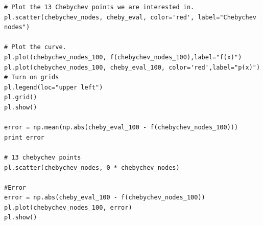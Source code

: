 \documentclass[a4paper,11pt]{article}
\begin{document}
{\begin{lstlisting}
# Plot the 13 Chebychev points we are interested in.
pl.scatter(chebychev_nodes, cheby_eval, color='red', label="Chebychev nodes")

# Plot the curve.
pl.plot(chebychev_nodes_100, f(chebychev_nodes_100),label="f(x)")
pl.plot(chebychev_nodes_100, cheby_eval_100, color='red',label="p(x)")
# Turn on grids
pl.legend(loc="upper left")
pl.grid()
pl.show()

error = np.mean(np.abs(cheby_eval_100 - f(chebychev_nodes_100)))
print error

# 13 chebychev points
pl.scatter(chebychev_nodes, 0 * chebychev_nodes)

#Error
error = np.abs(cheby_eval_100 - f(chebychev_nodes_100))
pl.plot(chebychev_nodes_100, error)
pl.show()

\end{lstlisting}
}
\end{document}
